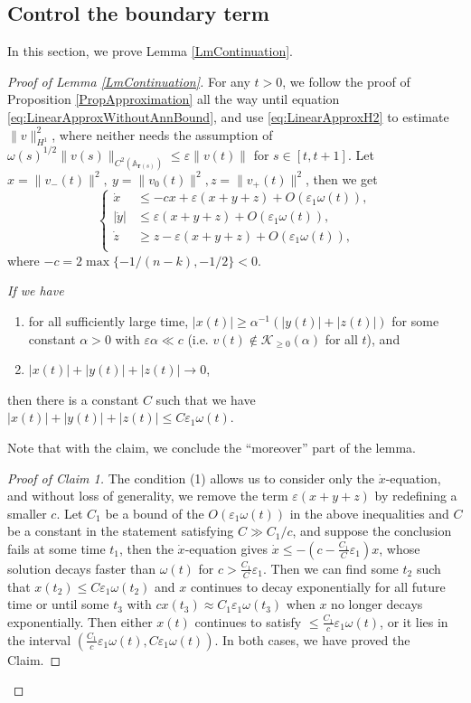 \documentclass[11pt]{amsart}
\numberwithin{equation}{section}
\numberwithin{equation}{section}
\newcommand{\eps}{\varepsilon}
\newcommand{\al}{\alpha}
\newcommand{\cK}{\mathcal{K}}
\begin{document}
	\subsection{Control the boundary term}\label{SS:ConeBoundary}
	In this section, we prove Lemma \ref{LmContinuation}. 
	\begin{proof}[Proof of Lemma \ref{LmContinuation}]
		
		
		For any $t>0$, we follow the proof of Proposition \ref{PropApproximation} all the way until equation \eqref{eq:LinearApproxWithoutAnnBound}, and use \eqref{eq:LinearApproxH2} to estimate $\|v\|_{H^1}^2$, where neither needs the assumption of $\omega(s)^{1/2}\|v(s)\|_{C^2(\mathbb A_{\mathbf r(s)})}\leq \eps\|v(t)\|$ for $s\in[t,t+1]$. Let $x=\|v_-(t)\|^2,\ y=\|v_0(t)\|^2, z=\|v_+(t)\|^2$, then we get 
		\begin{equation}\label{Eq3Eqs}
			\begin{cases}
				\dot x&\leq -cx+\eps(x+y+z)+O(\eps_1\omega(t)),\\
				|\dot y|&\leq \eps(x+y+z)+O(\eps_1\omega(t)),\\
				\dot z&\geq z-\eps(x+y+z)+O(\eps_1\omega(t)),\\
			\end{cases}
		\end{equation}
		where $-c=2\max\{-1/(n-k),-1/2\}<0$.  
		
		\medskip
		
		 {\it If we have 
			\begin{enumerate}
				\item for all sufficiently large time, $|x(t)|\geq \alpha^{-1} (|y(t)|+|z(t)|)$ for some constant $\alpha>0$ with $\eps\al\ll c$ (i.e. $v(t)\notin \cK_{\geq 0}(\alpha)$ for all $t$), and 
				\item $|x(t)|+|y(t)|+|z(t)|\to0$,
			\end{enumerate}
			then there is a constant $C$ such that  we have $|x(t)|+|y(t)|+|z(t)|\leq C\eps_1\omega(t)$.}
		\medskip
		
		Note that with the claim, we conclude the ``moreover'' part of the lemma.
		
		\begin{proof}[Proof of Claim 1] The condition (1) allows us to consider only the $\dot x$-equation, and without loss of generality, we remove the term $\eps (x+y+z)$ by redefining a smaller $c$. Let $C_1$ be a  bound of the $O(\eps_1\omega(t))$ in the above inequalities and $C$ be a constant in the statement satisfying $C\gg C_1/c$, and suppose the conclusion fails at some time $t_1$, then the $\dot x$-equation gives $\dot x\leq -(c-\frac{C_1}{C}\eps_1)x$, whose solution decays faster than $\omega(t)$ for $c>\frac{C_1}{C}\eps_1$. Then we can find some $t_2$ such that $x(t_2)\leq C\eps_1\omega(t_2)$ and $x$ continues to decay exponentially for all future time or until some $t_3$ with $cx(t_3)\approx C_1\eps_1\omega(t_3)$ when $x$ no longer decays exponentially. Then either $x(t)$ continues to satisfy $\leq \frac{C_1}{c}\eps_1\omega(t)$, or it lies in the interval $(\frac{C_1}{c}\eps_1\omega(t),C\eps_1\omega(t))$. In both cases, we have proved the Claim. 
		\end{proof}
		

\end{proof}
\end{document}
